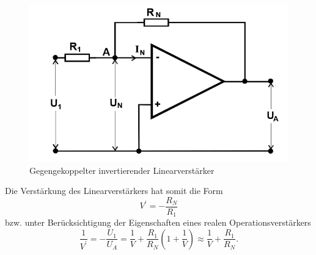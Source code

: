 \begin{figure}[h!]
	\centering
	\includegraphics[width=\textwidth]{img/linear.png}
	\caption{Gegengekoppelter invertierender Linearverstärker \cite{FP}}
	\label{abb:linear}
\end{figure}

\noindent Die Verstärkung des Linearverstärkers hat somit die Form
\begin{equation}
V^\prime = - \frac{R_N}{R_1}
\end{equation}
bzw. unter Berücksichtigung der Eigenschaften eines realen Operationsverstärkers
\begin{equation}
\frac{1}{V^\prime} = - \frac{U_1}{U_A} = \frac{1}{V} + \frac{R_1}{R_N} \left( 1 + \frac{1}{V} \right) \approx \frac{1}{V} + \frac{R_1}{R_N}.
\label{effVerstaerkung}
\end{equation}


